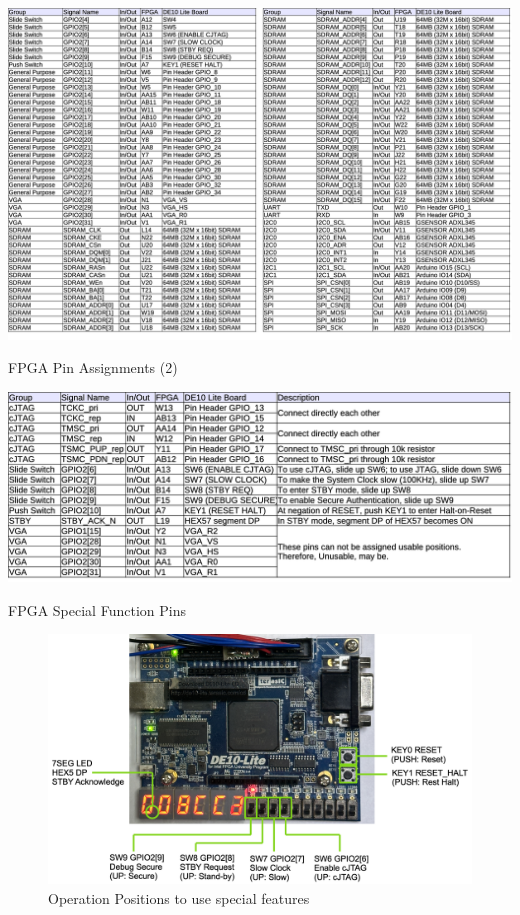 \begin{table}[H]
    \includegraphics[width=1.0\columnwidth]{./Table/FPGAPinAssign2.png}
    \caption{FPGA Pin Assignments (2)}
    \label{tb:FPGAPIN2}
\end{table}

\begin{table}[H]
    \includegraphics[width=1.0\columnwidth]{./Table/FPGASpecialPin.png}
    \caption{FPGA Special Function Pins}
    \label{tb:FPGAPINSPECIAL}
\end{table}

\begin{figure}[H]
    \includegraphics[width=1.0\columnwidth]{./Figure/SpecialFeatures.png}
    \caption{Operation Positions to use special features}
    \label{fig:SPECIALFEATURES}
\end{figure}


